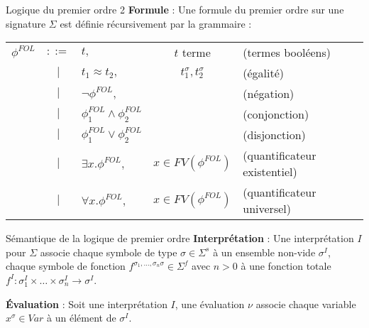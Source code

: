 \documentclass[9pt]{beamer}
\begin{document}
\begin{frame}{Logique du premier ordre 2}
\textbf{Formule} : Une formule du premier ordre sur une signature $\Sigma$ est d\'efinie r\'ecursivement par la grammaire :
\begin{tabular}{lclcl}
$\phi^{FOL}$ & $::=$ & $t,$ & $t$ terme & (termes bool\'eens)\\
 & $|$ & $t_{1} \approx t_{2},$ & $t_{1}^{\sigma},t_{2}^{\sigma}$ & (\'egalit\'e)\\
 & $|$ & $\neg\phi^{FOL},$ & & (n\'egation)\\
 & $|$ & $\phi_{1}^{FOL} \land \phi_{2}^{FOL}$ & & (conjonction)\\
 & $|$ & $\phi_{1}^{FOL} \lor \phi_{2}^{FOL}$ & & (disjonction)\\
 & $|$ & $\exists x.\phi^{FOL},$ & $x\in FV(\phi^{FOL})$ & (quantificateur existentiel)\\
 & $|$ & $\forall x.\phi^{FOL},$ & $x\in FV(\phi^{FOL})$ & (quantificateur universel)

\end{tabular}
\end{frame}

\begin{frame}{S\'emantique de la logique de premier ordre}
\textbf{Interpr\'etation} : Une interpr\'etation $I$ pour $\Sigma$ associe chaque symbole de type $\sigma \in \Sigma^{s}$ \`a un ensemble non-vide $\sigma^{I}$, chaque symbole de fonction $f^{\sigma_{1},\ldots,\sigma_{n}\sigma} \in \Sigma^{f}$ avec $n > 0$ \`a une fonction totale $f^{I} : \sigma_{1}^{I}\times \ldots \times \sigma_{n}^{I}\rightarrow\sigma^I$.

\textbf{\'Evaluation} : Soit une interpr\'etation $I$, une \'evaluation $\nu$ associe chaque variable $x^{\sigma} \in Var$ \`a un \'el\'ement de $\sigma^{I}$.

\end{frame}
\end{document}
